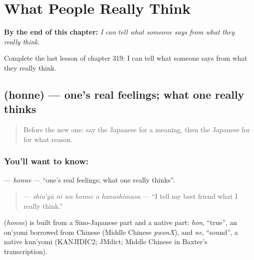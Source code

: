 
\chapter{What People Really Think}
\label{ch:ja-what-people-really-think}

\begin{chapteropening}
\textbf{By the end of this chapter:} \emph{I can tell what someone says from what they really think.}

Complete the last lesson of chapter 319: I can tell what someone says from what they really think.
\end{chapteropening}

\section[\texorpdfstring{\ja{ほんね} (honne)}{ほんね (honne)}]{ (honne) — one's real feelings; what one really thinks}

\label{lesson:JA-C319-honne}



\begin{quote}
Before the new one: say the Japanese for a meaning, then the Japanese for for what reason.
\end{quote}

\subsection*{You'll want to know: }
\textbf{} — \emph{honne} — \textquotedblleft{}one's real feelings; what one really thinks\textquotedblright{}.

\begin{quote}
\textbf{  } — \emph{shin'yū ni wa honne o hanashimasu} — \textquotedblleft{}I tell my best friend what I really think.\textquotedblright{}
\end{quote}

\begin{cousinweb}
\textbf{} (\emph{honne}) is built from a Sino-Japanese part and a native part: \emph{hon}, \textquotedblleft{}true\textquotedblright{}, an on'yomi borrowed from Chinese (Middle Chinese \emph{pwonX}), and \emph{ne}, \textquotedblleft{}sound\textquotedblright{}, a native kun'yomi (KANJIDIC2; JMdict; Middle Chinese in Baxter's transcription).
\end{cousinweb}

